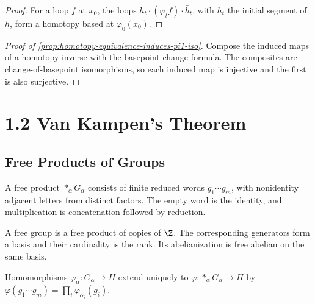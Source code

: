 \begin{proof}
\leanok
\sketch For a loop $f$ at $x_0$, the loops
$h_t\cdot(\varphi_t f)\cdot\bar h_t$, with $h_t$ the initial segment of $h$,
form a homotopy based at $\varphi_0(x_0)$.
\end{proof}

\begin{proof}[Proof of \cref{prop:homotopy-equivalence-induces-pi1-iso}]
\sketch Compose the induced maps of a homotopy inverse with the basepoint
change formula. The composites are change-of-basepoint isomorphisms, so each
induced map is injective and the first is also surjective.
\end{proof}

\section{1.2 Van Kampen's Theorem}
\label{sec:van-kampen-theorem}

\subsection*{Free Products of Groups}

\begin{definition}
\label{def:free-product-of-groups}
\leanok
{}
A free product $*_\alpha G_\alpha$ consists of finite reduced words
$g_1\cdots g_m$, with nonidentity adjacent letters from distinct factors.
The empty word is the identity, and multiplication is concatenation followed
by reduction.
\end{definition}

\begin{definition}
\label{def:free-group-basis-rank}
\leanok
{}
A free group is a free product of copies of $\Z$. The corresponding generators
form a basis and their cardinality is the rank. Its abelianization is free
abelian on the same basis.
\end{definition}

\begin{proposition}
\label{prop:free-product-universal-property}
\leanok
{}
Homomorphisms $\varphi_\alpha:G_\alpha\to H$ extend uniquely to
$\varphi:*_\alpha G_\alpha\to H$ by
$\varphi(g_1\cdots g_m)=\prod_i\varphi_{\alpha_i}(g_i)$.
\end{proposition}

